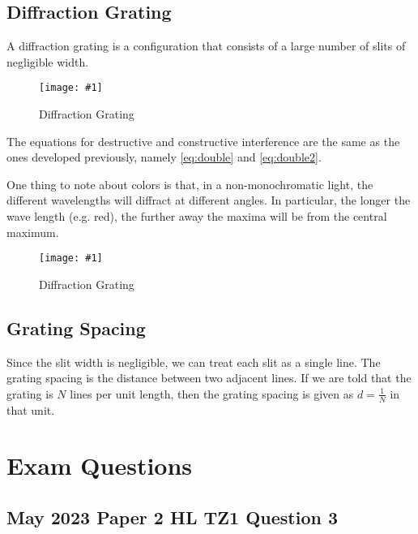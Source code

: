 \documentclass[a4paper,12pt]{article}
\let\oldsection\section
\renewcommand\section{\clearpage\oldsection}
\newcommand{\img}[4]{\begin{center}
  \begin{figure}[H]
    \centering
    \texttt{[image: \#1]}
    \caption{#3}
    \label{fig:#4}
  \end{figure}
\end{center}}
\begin{document}
\pagebreak

\subsection{Diffraction Grating}

A diffraction grating is a configuration that consists of a large number of slits of negligible width.

\img{gratingintensity.png}{0.3}{Diffraction Grating}{gratingintensity}

The equations for destructive and constructive interference are the same as the ones developed previously, namely \cref{eq:double} and \cref{eq:double2}.

One thing to note about colors is that, in a non-monochromatic light, the different wavelengths will diffract at different angles. In particular, the longer the wave length (e.g. red), the further away the maxima will be from the central maximum.

\img{ex/12.png}{0.3}{Diffraction Grating}{ex12}

\subsection{Grating Spacing}

Since the slit width is negligible, we can treat each slit as a single line. The grating spacing is the distance between two adjacent lines. If we are told that the grating is $N$ lines per unit length, then the grating spacing is given as $d = \frac{1}{N}$
in that unit.

\section{Exam Questions}

\subsection{May 2023 Paper 2 HL TZ1 Question 3}
\end{document}
